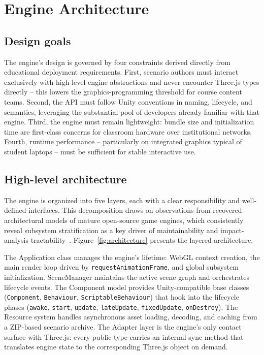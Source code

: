 \section{Engine Architecture}
\subsection{Design goals}
The engine's design is governed by four constraints derived directly from educational deployment requirements. First, scenario authors must interact exclusively with high-level engine abstractions and never encounter Three.js types directly -- this lowers the graphics-programming threshold for course content teams. Second, the API must follow Unity conventions in naming, lifecycle, and semantics, leveraging the substantial pool of developers already familiar with that engine. Third, the engine must remain lightweight: bundle size and initialization time are first-class concerns for classroom hardware over institutional networks. Fourth, runtime performance -- particularly on integrated graphics typical of student laptops -- must be sufficient for stable interactive use.

\subsection{High-level architecture}
The engine is organized into five layers, each with a clear responsibility and well-defined interfaces. This decomposition draws on observations from recovered architectural models of mature open-source game engines, which consistently reveal subsystem stratification as a key driver of maintainability and impact-analysis tractability~\cite{Ullmann2025}. Figure~\ref{fig:architecture} presents the layered architecture.

The Application class manages the engine's lifetime: WebGL context creation, the main render loop driven by \texttt{requestAnimationFrame}, and global subsystem initialization. SceneManager maintains the active scene graph and orchestrates lifecycle events. The Component model provides Unity-compatible base classes (\texttt{Component}, \texttt{Behaviour}, \texttt{ScriptableBehaviour}) that hook into the lifecycle phases (\texttt{awake}, \texttt{start}, \texttt{update}, \texttt{lateUpdate}, \texttt{fixedUpdate}, \texttt{onDestroy}). The Resource system handles asynchronous asset loading, decoding, and caching from a ZIP-based scenario archive. The Adapter layer is the engine's only contact surface with Three.js: every public type carries an internal sync method that translates engine state to the corresponding Three.js object on demand.

